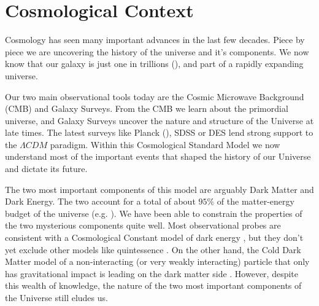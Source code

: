 
\section{Cosmological Context}

Cosmology has seen many important advances in the last few decades. Piece by piece we are uncovering the history of the universe and it's components. We now know that our galaxy is just one in trillions (\cite{2016ApJ...830...83C}), and part of a rapidly expanding universe.

Our two main observational tools today are the Cosmic Microwave Background (CMB) and Galaxy Surveys. From the CMB we learn about the primordial universe, and Galaxy Surveys uncover the nature and structure of the Universe at late times. The latest surveys like Planck (\cite{2016A&A...594A..13P}), SDSS  or DES  lend strong support to the $\Lambda CDM$ paradigm. Within this Cosmological Standard Model we now understand most of the important events that shaped the history of our Universe and dictate its future. 

The two most important components of this model are arguably Dark Matter and Dark Energy. The two account for a total of about $95\%$ of the matter-energy budget of the universe (e.g. \cite{2016A&A...594A..13P}). We have been able to constrain the properties of the two mysterious components quite well. Most observational probes are consistent with a Cosmological Constant model of dark energy , but they don't yet exclude other models like quintessence . On the other hand, the Cold Dark Matter model of a non-interacting (or very weakly interacting) particle that only has gravitational impact is leading on the dark matter side . However, despite this wealth of knowledge, the nature of the two most important components of the Universe still eludes us.




